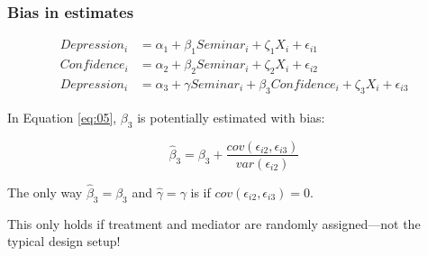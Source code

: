 \documentclass[11pt,english,dvipsnames,aspectratio=169,handout]{beamer}\usepackage[]{graphicx}\usepackage[]{xcolor}
\begin{document}
\begin{frame}
\frametitle{Bias in estimates}
 \footnotesize
   \begin{align}
   Depression_i &= \alpha_1 + \beta_1Seminar_i + \zeta_1X_i + \epsilon_{i1} \\
   Confidence_i &= \alpha_2 + \beta_2Seminar_i + \zeta_2X_i + \epsilon_{i2}\\
   Depression_i &= \alpha_3 + \gamma Seminar_i + \beta_3Confidence_i + \zeta_3X_i + \epsilon_{i3}\label{eq:05}
   \end{align}
   \normalsize
   
   In Equation \ref{eq:05}, $\beta_3$ is potentially estimated with bias:
   
   \begin{equation}
     \hat{\beta}_3 = \beta_3 + \frac{cov(\epsilon_{i2}, \epsilon_{i3})}{var(\epsilon_{i2})}
   \end{equation}\pause
  
  The only way $\hat{\beta}_3 = \beta_3$ and $\hat{\gamma} = \gamma$ is if $cov(\epsilon_{i2}, \epsilon_{i3}) = 0$.
  \pause
  
  This only holds if treatment and mediator are randomly assigned---not the typical design setup!

\end{frame}
\end{document}

